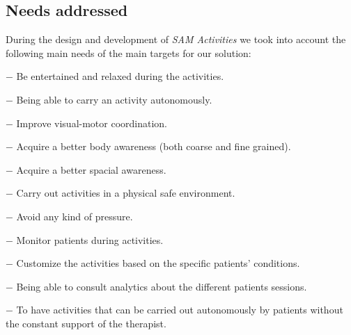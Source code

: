 	\subsection{Needs addressed}
	During the design and development of \textit{SAM Activities} we took into account the following main needs of the main targets for our solution:
	\begin{description}
		\item[\textbf{Patients}:] 
				\item{$ - $} Be entertained and relaxed during the activities.
				\item{$ - $} Being able to carry an activity autonomously.
				\item {$ - $} Improve visual-motor coordination.
				\item{$ - $} Acquire a better body awareness (both coarse and fine grained).
				\item{$ - $} Acquire a better spacial awareness.
				\item{$ - $} Carry out activities in a physical safe environment.
				\item{$ - $} Avoid any kind of pressure.
	\end{description}
	\begin{description}
		\item[\textbf{Therapists}:] 
			\item{$ - $} Monitor patients during activities.
			\item{$ - $} Customize the activities based on the specific patients' conditions.
			\item{$ - $} Being able to consult analytics about the different patients sessions.
			\item{$ - $} To have activities that can be carried out autonomously by patients without the constant support of the therapist.
	\end{description}

